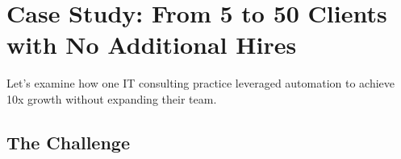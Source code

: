 %
%
%
%
%
%
%
%
%
%
%


\section{Case Study: From 5 to 50 Clients with No Additional Hires}

Let's examine how one IT consulting practice leveraged automation to achieve 10x growth without expanding their team.

\subsection{The Challenge}

